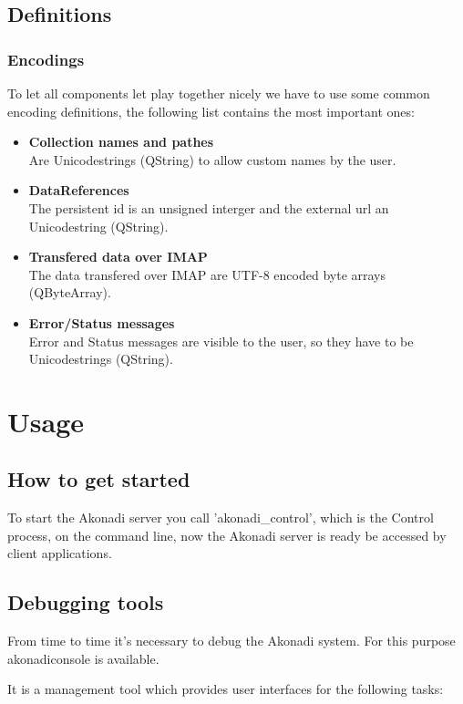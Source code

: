 \documentclass[]{report}
\begin{document}
\section{Definitions}

\subsection{Encodings}
To let all components let play together nicely we have to use some common encoding
definitions, the following list contains the most important ones:
\begin{itemize}
  \item \textbf{Collection names and pathes}\\
        Are Unicodestrings (QString) to allow custom names by the user.
  \item \textbf{DataReferences}\\
        The persistent id is an unsigned interger and the external url
        an Unicodestring (QString).
  \item \textbf{Transfered data over IMAP}\\
        The data transfered over IMAP are UTF-8 encoded byte arrays (QByteArray).
  \item \textbf{Error/Status messages}\\
        Error and Status messages are visible to the user, so they have to be
        Unicodestrings (QString).
\end{itemize}

\chapter{Usage}

\section{How to get started}
To start the Akonadi server you call 'akonadi\_control', which is the Control process,
on the command line, now the Akonadi server is ready be accessed by client applications.

\section{Debugging tools}
From time to time it's necessary to debug the Akonadi system. For this purpose akonadiconsole
is available.

It is a management tool which provides user interfaces for the following tasks:
\end{document}
